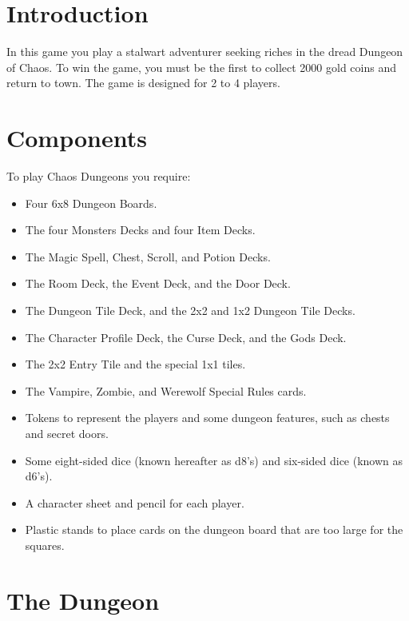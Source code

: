\documentclass{book}
\begin{document}
\section{Introduction}

In this game you play a stalwart adventurer seeking riches in the dread Dungeon of Chaos. To win the game, you must be the first to collect 2000 gold coins and return to town. The game is designed for 2 to 4 players.

\section{Components}

To play Chaos Dungeons you require:

\begin{itemize}
\item Four 6x8 Dungeon Boards.
\item The four Monsters Decks and four Item Decks.
\item The Magic Spell, Chest, Scroll, and Potion Decks.
\item The Room Deck, the Event Deck, and the Door Deck.
\item The Dungeon Tile Deck, and the 2x2 and 1x2 Dungeon Tile Decks.
\item The Character Profile Deck, the Curse Deck, and the Gods Deck.
\item The 2x2 Entry Tile and the special 1x1 tiles.
\item The Vampire, Zombie, and Werewolf Special Rules cards.
\item Tokens to represent the players and some dungeon features, such as chests and secret doors.
\item Some eight-sided dice (known hereafter as d8’s) and six-sided dice (known as d6’s).
\item A character sheet and pencil for each player.
\item Plastic stands to place cards on the dungeon board that are too large for the squares.  
\end{itemize}

\section{The Dungeon}
\end{document}
